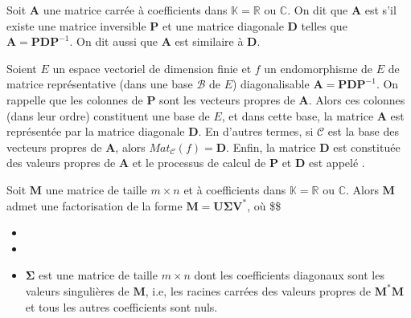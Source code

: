 \documentclass[letterpaper,11pt,english]{sphinxmanual}
\begin{document}
\begin{DUlineblock}{0em}
\item[] 
\item[]  Soit \(\mathbf{A}\) une matrice carrée à
coefficients dans
\(\mathbb{K}=\mathbb{R} \text{ ou } \mathbb{C}\). On dit que
\(\mathbf{A}\) est  s’il existe une matrice
inversible \(\mathbf{P}\) et une matrice diagonale
\(\mathbf{D}\) telles que
\(\mathbf{A} = \mathbf{P}\mathbf{D}\mathbf{P}^{-1}\). On dit aussi
que \(\mathbf{A}\) est similaire à \(\mathbf{D}\).
\item[]  Soient \(E\) un espace vectoriel de dimension finie
et \(f\) un endomorphisme de \(E\) de matrice représentative
(dans une base \(\mathcal{B}\) de \(E\)) diagonalisable
\(\mathbf{A}=\mathbf{P}\mathbf{D}\mathbf{P}^{-1}\). On rappelle
que les colonnes de \(\mathbf{P}\) sont les vecteurs propres de
\(\mathbf{A}\). Alors ces colonnes (dans leur ordre) constituent
une base de \(E\), et dans cette base, la matrice
\(\mathbf{A}\) est représentée par la matrice diagonale
\(\mathbf{D}\). En d’autres termes, si \(\mathcal{C}\) est la
base des vecteurs propres de \(\mathbf{A}\), alors
\(Mat_{\mathcal{C}}(f)=\mathbf{D}\). Enfin, la matrice
\(\mathbf{D}\) est constituée des valeurs propres de
\(\mathbf{A}\) et le processus de calcul de \(\mathbf{P}\) et
\(\mathbf{D}\) est appelé .
\item[] 
\item[] Soit \(\mathbf{M}\) une matrice de taille \(m\times n\) et à
coefficients dans
\(\mathbb{K}=\mathbb{R} \text{ ou } \mathbb{C}\). Alors
\(\mathbf{M}\) admet une factorisation de la forme
\(\mathbf{M}=\mathbf{U}\mathbf{\Sigma} \mathbf{V}^*\), où \$\$
\end{DUlineblock}
\begin{itemize}
\item {} 

\item {} 

\item {} 
\sphinxAtStartPar
\(\mathbf{\Sigma}\) est une matrice de taille \(m\times n\)
dont les coefficients diagonaux sont les valeurs singulières de
\(\mathbf{M}\), i.e, les racines carrées des valeurs propres de
\(\mathbf{M}^*\mathbf{M}\) et tous les autres coefficients sont
nuls.

\end{itemize}
\end{document}
